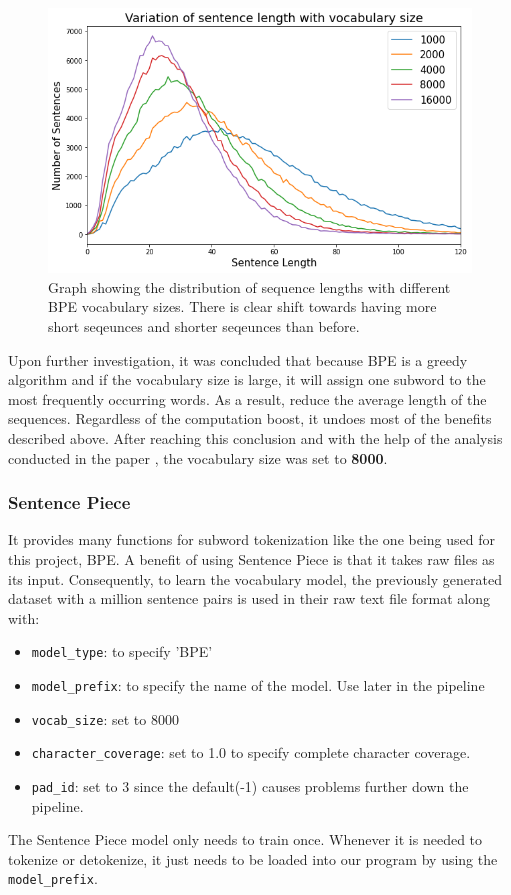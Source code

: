 \documentclass[12pt,a4paper,twoside,openright]{report}
\begin{document}
\begin{figure}
    \centering
    \includegraphics[width=\textwidth*3/4]{figs/length-vs-vocab-size.png}
    \caption{Graph showing the distribution of sequence lengths with different BPE vocabulary sizes. There is clear shift towards having more short seqeunces and shorter seqeunces than before.}
    \label{fig:sentence-length-vs-vocab-size}
\end{figure}
Upon further investigation, it was concluded that because BPE is a greedy algorithm and if the vocabulary size is large, it will assign one subword to the most frequently occurring words. As a result, reduce the average length of the sequences. Regardless of the computation boost, it undoes most of the benefits described above. After reaching this conclusion and with the help of the analysis conducted in the paper \cite{vocabsize}, the vocabulary size was set to \textbf{8000}.
\subsubsection{Sentence Piece}

It provides many functions for subword tokenization like the one being used for this project, BPE. A benefit of using Sentence Piece is that it takes raw files as its input. Consequently, to learn the vocabulary model, the previously generated dataset with a million sentence pairs is used in their raw text file format along with: 
\begin{itemize}
    \item \lstinline{model_type}: to specify 'BPE'
    \item \lstinline{model_prefix}: to specify the name of the model. Use later in the pipeline
    \item \lstinline{vocab_size}: set to 8000
    \item \lstinline{character_coverage}: set to 1.0 to specify complete character coverage. 
    \item \lstinline{pad_id}: set to 3 since the default(-1) causes problems further down the pipeline. 
    
\end{itemize}
The Sentence Piece model only needs to train once. Whenever it is needed to tokenize or detokenize, it just needs to be loaded into our program by using the \lstinline{model_prefix}. 
\end{document}
